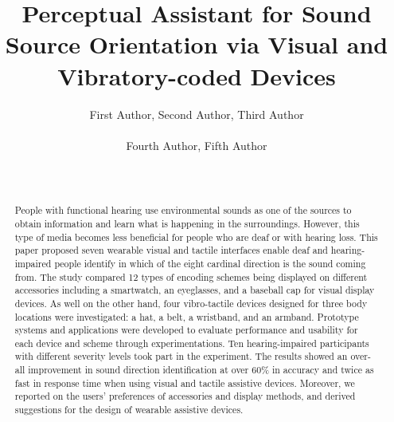 \documentclass{sigchi}
\begin{document}
\title{Perceptual Assistant for Sound Source Orientation via Visual and Vibratory-coded Devices}

\author{ 
	\alignauthor First Author, Second Author, Third Author\\
	\\Fourth Author, Fifth Author\\
	\\
	\\
}


\maketitle


\begin{abstract}
People with functional hearing use environmental sounds as one of the sources to obtain information and learn what is happening in the surroundings. However, this type of media becomes less beneficial for people who are deaf or with hearing loss. This paper proposed seven wearable visual and tactile interfaces enable deaf and hearing-impaired people identify in which of the eight cardinal direction is the sound coming from. The study compared 12 types of encoding schemes being displayed on different accessories including a smartwatch, an eyeglasses, and a baseball cap for visual display devices. As well on the other hand, four vibro-tactile devices designed for three body locations were investigated: a hat, a belt, a wristband, and an armband. Prototype systems and applications were developed to evaluate performance and usability for each device and scheme through experimentations. Ten hearing-impaired participants with different severity levels took part in the experiment. The results showed an over-all improvement in sound direction identification at over 60\% in accuracy and twice as fast in response time when using visual and tactile assistive devices. Moreover, we reported on the users' preferences of accessories and display methods, and derived suggestions for the design of wearable assistive devices.
\end{abstract}
\end{document}

